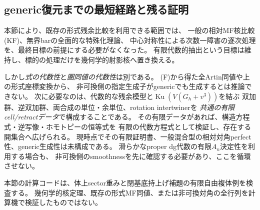 \subsection{generic復元までの最短経路と残る証明}

本節により、既存の形式残余比較を利用できる範囲では、
一般の相対MF核比較(KF)、無界barの全面的な特殊化理論、
中心対称性による次数一障害の逐次処理を、最終目標の前提にする必要がなくなった。
有限代数的抽出という目標は維持し、標的の処理だけを幾何学的射影核へ置き換える。

しかし\emph{式の代数性}と\emph{圏同値の代数性}は別である。
(F)から得た全Artin同値や上の形式座標変換から、
非可換側の指定生成子がgenericでも生成するとは推論できない。
次に必要なのは、代数的な残余模型と$\operatorname{Ku}(V(G_h+v^3))$を結ぶ
双加群、逆双加群、両合成の単位・余単位、rotation intertwinerを
\emph{共通の有限cell/retractデータ}で構成することである。
その有限データがあれば、構造方程式・逆写像・ホモトピーの恒等式を
有限の代数方程式として検証し、存在する開集合へ広げられる。
現時点でその有限証明書、一般混合型の相対対角perfect性、generic生成性は未構成である。
滑らかなproper dg代数の有限$A_n$決定性\cite{GRToenFinite}を利用する場合も、
非可換側のsmoothnessを先に確認する必要があり、ここを循環させない。

本節の計算コードは、体上sector重みと閉基底持上げ補題の有限自由複体例を検査する。
幾何学的核定理、既存の形式MF同値、または非可換対角の全行列を計算機で検証したものではない。
